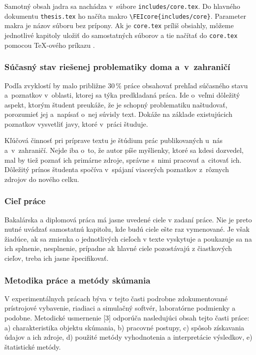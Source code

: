 \documentclass[../../../thesis.tex]{subfiles}
\begin{document}
Samotný obsah jadra sa nachádza v~súbore \verb|includes/core.tex|.
Do hlavného dokumentu \verb|thesis.tex| ho načíta makro \verb|\FEIcore{includes/core}|.
Parameter makra je názov súboru bez prípony.
Ak je \verb|core.tex| príliš obsiahly,
môžeme jednotlivé kapitoly uložiť do samostatných
súborov a tie načítať do \verb|core.tex|
pomocou \TeX-ového príkazu \verb||.

\subsubsection*{\normalsize Súčasný stav riešenej problematiky
doma a~v~zahraničí}
Podľa zvyklostí by malo približne 30\,\% práce obsahovať prehľad
súčasného stavu a~poznatkov v~oblasti,
ktorej sa týka predkladaná práca.
Ide o~veľmi dôležitý aspekt,
ktorým študent preukáže,
že je schopný problematiku naštudovať,
porozumieť jej a~napísať o~nej súvisly text.
Dokáže na základe existujúcich poznatkov vysvetliť javy,
ktoré v~práci študuje.

Kľúčová činnosť pri príprave textu je štúdium prác publikovaných
u~nás a~v~zahraničí.
Nejde iba o~to, že autor píše myšlienky, ktoré sa kdesi dozvedel,
mal by tiež poznať ich primárne zdroje,
správne s~nimi pracovať a~citovať ich.
Dôležitý prínos študenta spočíva v~spájaní viacerých poznatkov
z~rôznych zdrojov do nového celku.

\subsubsection*{\normalsize Cieľ práce}
Bakalárska a diplomová práca má jasne uvedené ciele v zadaní práce. Nie je preto nutné uvádzať samostatnú kapitolu, kde budú ciele ešte raz vymenované. Je však žiadúce, ak sa zmienka o jednotlivých cieľoch v texte vyskytuje a poukazuje sa na ich splnenie, nesplnenie, prípadne ak hlavné ciele pozostávajú z čiastkových cieľov, treba ich jasne špecifikovať.

\subsubsection*{\normalsize Metodika práce a metódy skúmania}
V experimentálnych prácach býva v tejto časti podrobne zdokumentované prístrojové vybavenie, riadiaci a simulačný softvér, laboratórne podmienky a podobne. Metodické usmernenie [3] odporúča nasledujúci obsah tejto časti práce: a) charakteristika objektu skúmania, b) pracovné postupy, c) spôsob získavania údajov a ich zdroje, d) použité metódy vyhodnotenia a interpretácie výsledkov, e) štatistické metódy.
\end{document}

